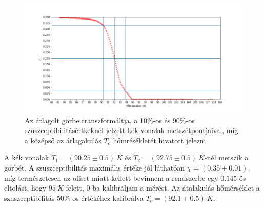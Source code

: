 \documentclass[a4paper,12pt]{article}
\begin{document}
\vspace{2mm}

\begin{figure}[!htb]
\centering
\includegraphics[width=1\textwidth]{szuszcepti.png}
\caption{Az átlagolt görbe transzformáltja, a 10\%-os és 90\%-os szuszceptibilitásértkeknél jelzett kék vonalak metszétpontjaival, míg a középső az átlagakulás $T_{c}$ hőmrésékletét hivatott jelezni}
\end{figure}

\vspace{2mm}

\par A kék vonalak $T_{1} = (90.25 \pm 0.5) ~K$ és $T_{2} = (92.75 \pm 0.5) ~K$-nél metszik a görbét. A szuszceptibilitás maximális értéke jól láthatóan $ \chi = ( 0.35 \pm 0.01) $, míg természetesen az offset miatt kellett bevinnem a rendszerbe egy $0.145$-ös eltolást, hogy $95~K$ felett, $0$-ba kalibráljam a mérést. Az átalakulás hőmérséklet a szuszceptibilitás 50\%-os értékéhez kalibrálva $T_{c} = (92.1 \pm 0.5) ~K$.
\end{document}
